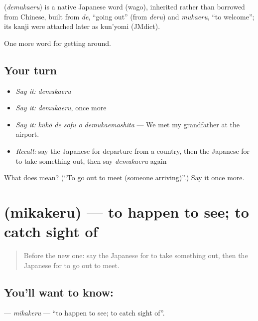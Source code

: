 \begin{cousinweb}
\textbf{} (\emph{demukaeru}) is a native Japanese word (wago), inherited rather than borrowed from Chinese, built from \emph{de}, \textquotedblleft{}going out\textquotedblright{} (from \emph{deru}) and \emph{mukaeru}, \textquotedblleft{}to welcome\textquotedblright{}; its kanji were attached later as kun'yomi (JMdict).
\end{cousinweb}

\begin{grammarlens}[title={What you've built}]
One more word for getting around.
\end{grammarlens}

\subsection*{Your turn}
\begin{itemize}
\raggedright
  \item \emph{Say it:} \emph{demukaeru}
  \item \emph{Say it:} \emph{demukaeru}, once more
  \item \emph{Say it:} \emph{kūkō de sofu o demukaemashita} — We met my grandfather at the airport.
  \item \emph{Recall:} say the Japanese for departure from a country, then the Japanese for to take something out, then say \emph{demukaeru} again
\end{itemize}

\begin{tcolorbox}[breakable,colback=teal!4,colframe=teal!35!black,title={Before you move on}]
What does  mean? (\textquotedblleft{}To go out to meet (someone arriving)\textquotedblright{}.) Say it once more.
\end{tcolorbox}
\section[\texorpdfstring{\ja{みかける} (mikakeru)}{みかける (mikakeru)}]{ (mikakeru) — to happen to see; to catch sight of}

\label{lesson:JA-C387-mikakeru}



\begin{quote}
Before the new one: say the Japanese for to take something out, then the Japanese for to go out to meet.
\end{quote}

\subsection*{You'll want to know: }
\textbf{} — \emph{mikakeru} — \textquotedblleft{}to happen to see; to catch sight of\textquotedblright{}.

